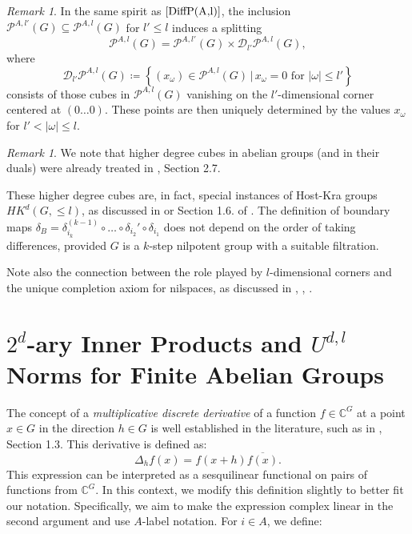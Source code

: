 \documentclass{amsart}
\theoremstyle{definition}
\theoremstyle{remark}
\newtheorem{remark}[theorem]{Remark}
\numberwithin{equation}{section}
\begin{document}
\begin{remark}
    In the same spirit as $\eqref{DiffP(A,l)}$, the inclusion $\mathcal{P}^{A,l'}(G) \subseteq \mathcal{P}^{A,l}(G)$ for $l'\le l$ induces a splitting  
    $$\mathcal{P}^{A,l}(G) =  \mathcal{P}^{A,l'}(G) \times \mathcal{D}_{l'}\mathcal{P}^{A,l}(G),$$
    where 
    \begin{equation}
\label{Diff2P(A,l)}
    \mathcal{D}_{l'}\mathcal{P}^{A,l}(G) \coloneqq \left\{ (x_\omega) \in \mathcal{P}^{A,l}(G) \, | \, x_\omega = 0 \text{ for } |\omega| \le l' \right\}
\end{equation}
  consists of those cubes  in $\mathcal{P}^{A,l}(G)$ vanishing on the $l'$-dimensional corner centered at $(0 \dots 0)$. These points are then uniquely determined  by the values $x_\omega$ for $l'<|\omega| \le l$. 
\end{remark}


\begin{remark} We note that higher degree cubes in abelian groups (and in their duals) were already treated in \cite{Szeg12}, Section 2.7.

These higher degree cubes are, in fact, special instances of Host-Kra groups $HK^d(G,\le l)$, as discussed in \cite{HoKr05} or Section 1.6. of \cite{Tao12}. The definition of boundary maps $\delta_B = \delta_{i_k}^{(k-1)} \circ  \dots  \circ \delta_{i_2}'\circ \delta_{i_1}$  does not depend on the order of taking differences, provided $G$ is a $k$-step nilpotent group with a suitable filtration. 


Note also the connection between the role played by $l$-dimensional corners and the unique completion axiom for nilspaces, as discussed in  \cite{HoKr08}, \cite{Szeg12}, \cite{CamSze10}.
\end{remark}

\section{\texorpdfstring{$2^d$-ary Inner Products and $U^{d,l}$ Norms for Finite Abelian Groups}{2\^d-ary Inner Products and U\^{d,l} Norms for Finite Abelian Groups}}
\label{sec:norms}

The concept of a \textit{multiplicative discrete derivative} of a function $f \in \mathbb{C}^G$ at a point $x \in G$ in the direction $h \in G$ is well established in the literature, such as in  \cite{Tao12}, Section 1.3. This derivative is defined as:
$$ \Delta_h f(x) = f(x+h)\overline{f(x)}.$$ 
This expression can be interpreted as a sesquilinear functional on pairs of functions from $\mathbb{C}^G$. In this context, we modify this definition slightly to better fit our notation. Specifically, we aim to make the expression complex linear in the second argument and use $A$-label notation. For $i \in A$, we define:  
\end{document}
